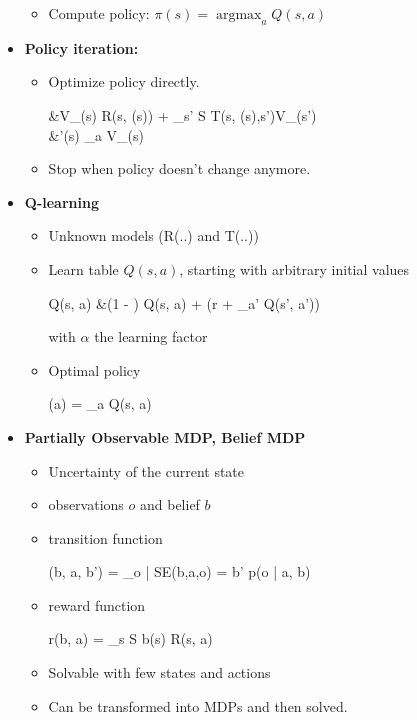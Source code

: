 \documentclass[10pt,a4paper,landscape]{article}
\makeatletter
\DeclareMathOperator*{\argmax}{argmax}
\newenvironment{myalign*}{%
  \setlength{\abovedisplayskip}{2pt}%
  \setlength{\belowdisplayskip}{2pt}%
  \start@align\@ne\st@rredtrue\m@ne
}%
{\endalign}
\makeatother
\begin{document}
\begin{multicols*}{5}
\begin{itemize}
\begin{itemize}
		\item Compute policy: $\pi(s) = \argmax_{a} Q(s, a)$
	\end{itemize}
	\item \textbf{Policy iteration:}
	\begin{itemize}
		\item Optimize policy directly. 
		\begin{myalign*}
		    &V_{\pi}(s) \leftarrow R(s, \pi(s)) + \gamma \sum_{s' \in S} T(s, \pi(s),s')V_{\pi}(s')\\
		    &\pi'(s) \leftarrow \argmax_{a} V_{\pi}(s)
		\end{myalign*}
		\item Stop when policy doesn't change anymore.
	\end{itemize}
	\item \textbf{Q-learning}
	\begin{itemize}
		\item Unknown models (R(..) and T(..))
		\item Learn table $Q(s, a)$, starting with arbitrary initial values
		\begin{myalign*}
		    Q(s, a) &\leftarrow (1 - \alpha) Q(s, a) + \alpha (r + \gamma \max_{a'} Q(s', a'))
		\end{myalign*}
		with $\alpha$ the learning factor
		\item Optimal policy
		\begin{myalign*}
		    \pi(a) = \argmax_{a} Q(s, a)
		\end{myalign*}
	\end{itemize}
	\item \textbf{Partially Observable MDP, Belief MDP}
	\begin{itemize}
		\item Uncertainty of the current state
		\item observations $o$ and belief $b$
		\item transition function
		\begin{myalign*}
		    \tau(b, a, b') = \sum_{o | SE(b,a,o) = b'} p(o | a, b)
		\end{myalign*}
		\item reward function
		\begin{myalign*}
		     r(b, a) = \sum_{s \in S} b(s) R(s, a)
		 \end{myalign*} 
		 \item Solvable with few states and actions
		 \item Can be transformed into MDPs and then solved.
	\end{itemize}
\end{itemize}


\end{multicols*}
\end{document}
